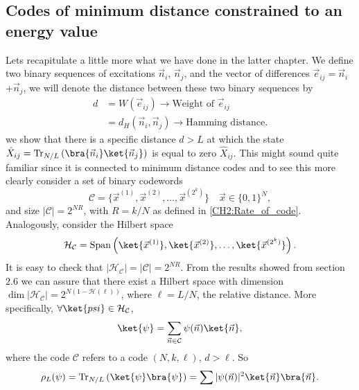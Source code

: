 \subsection{Codes of minimum distance constrained to an energy value}
Lets recapitulate a little more what we have done in the latter chapter. We define two binary sequences of excitations $\vec{n}_i$, $\vec{n}_j$, and the vector of differences $\vec{e}_{ij}=\vec{n}_i$+$\vec{n}_j$, we will denote the distance between these two binary sequences by
\begin{equation}
\begin{aligned}
d&=W(\vec{e}_{ij})\rightarrow \text{Weight of }\vec{e}_{ij} \\
&=d_{H}(\vec{n}_i, \vec{n}_j) \rightarrow \text{Hamming distance.}
\end{aligned}
\end{equation}
we show that there is a specific distance $d>L$ at which the state $\hat{X}_{ij}=\operatorname{Tr}_{N/L}\left(\bra{\vec{n}_i}\ket{\vec{n}_j}\right)$ is equal to zero $\hat{X}_{ij}$. This might sound quite familiar since it is connected to minimum distance codes and to see this more clearly consider a set of binary codewords
\begin{equation}
\mathcal{C}=\{\vec{x}^{(1)},\vec{x}^{(2)},\ldots,\vec{x}^{(2^k)}\} \quad \vec{x}\in\{0,1\}^{N},
\end{equation}
and size $|\mathcal{C}|=2^{NR}$, with $R=k/N$ as defined in \eqref{CH2:Rate_of_code}. Analogously, consider the Hilbert space
\begin{equation}
\mathcal{H}_{\mathcal{C}}=\operatorname{Span}\left(\ket{\vec{x}^{(1)}},\ket{\vec{x}^{(2)}},\ldots,\ket{\vec{x}^{(2^k)}}\right).
\end{equation}
It is easy to check that $|\mathcal{H}_{\mathcal{C}}|=|\mathcal{C}|=2^{NR}$. From the results showed from section $2.6$ we can assure that there exist a Hilbert space with dimension $\operatorname{dim}|\mathcal{H}_{\mathcal{C}}|=2^{N(1-\mathcal{H}(\ell))}$, where $\ell = L/N$, the relative distance. More specifically, $\forall \ket{psi}\in \mathcal{H}_{\mathcal{C}}$,
\begin{equation}
\ket{\psi} = \sum_{\vec{n}\in\mathcal{C}}\psi(\vec{n})\ket{\vec{n}},
\end{equation}
where the code $\mathcal{C}$ refers to a code $(N,k,\ell)$, $d>\ell$. So 
\begin{equation}
\rho_{L}(\psi) = \operatorname{Tr}_{N/L}\left(\ket{\psi}\bra{\psi}\right) = \sum |\psi(\vec{n})|^2 \ket{\vec{n}}\bra{\vec{n}}.
\end{equation}

